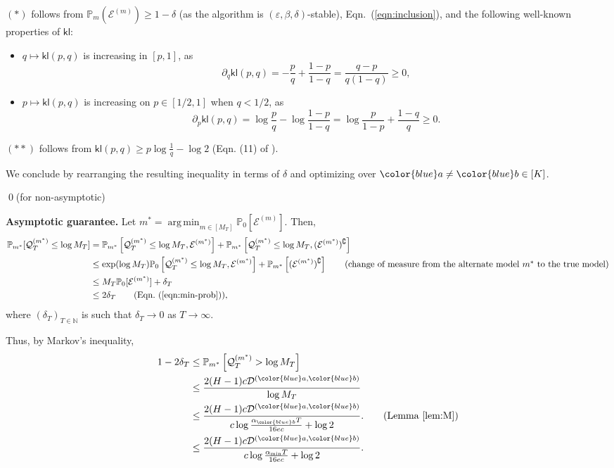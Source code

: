 \documentclass[twoside]{article}
\def\kl{{\mathsf{kl}}}
\def\eqref#1{(\ref{#1})}
\def\gD{{\mathcal{D}}}
\def\gE{{\mathcal{E}}}
\def\gQ{{\mathcal{Q}}}
\def\sN{{\mathbb{N}}}
\def\sP{{\mathbb{P}}}
\DeclareMathOperator*{\argmin}{arg\,min}
\theoremstyle{plain}
\begin{document}
$(*)$ follows from $\sP_m(\gE^{(m)}) \geq 1 - \delta$ (as the algorithm is $(\varepsilon, \beta, \delta)$-stable), Eqn.~\eqref{eqn:inclusion}, and the following well-known properties of $\kl$:
\begin{itemize}
    \item $q \mapsto \kl(p, q)$ is increasing in $[p, 1]$, as
    \begin{equation*}
        \partial_q \kl(p, q) = -\frac{p}{q} + \frac{1 - p}{1 - q}
        = \frac{q - p}{q(1 - q)} \geq 0,
    \end{equation*}
    \item $p \mapsto \kl(p, q)$ is increasing on $p \in [1/2, 1]$ when $q < 1/2$, as 
    \begin{equation*}
        \partial_p \kl(p, q) 
        = \log\frac{p}{q} - \log\frac{1 - p}{1 - q}
        = \log \frac{p}{1 - p} + \frac{1 - q}{q}
        \geq 0.
    \end{equation*}
\end{itemize}
$(**)$ follows from $\kl(p, q) \geq p \log\frac{1}{q} - \log 2$ (Eqn. (11) of \cite{garivier2019lower}).

We conclude by rearranging the resulting inequality in terms of $\delta$ and optimizing over ${\color{blue}a} \neq {\color{blue}b} \in [K]$.

\qed (for non-asymptotic)






\vspace{0.1cm}
\textbf{Asymptotic guarantee.}
Let $m^* = \argmin_{m \in [M_T]} \sP_0[\gE^{(m)}]$.
Then,
\begin{align*}
    \sP_{m^*}[\gQ_T^{(m^*)} \leq \log M_T] &= \sP_{m^*}\left[ \gQ_T^{(m^*)} \leq \log M_T, \gE^{(m^*)} \right] + \sP_{m^*}\left[\gQ_T^{(m^*)} \leq \log M_T, (\gE^{(m^*)})^\complement \right] \\
    &\leq \exp(\log M_T) \sP_0 \left[\gQ_T^{(m^*)} \leq \log M_T, \gE^{(m^*)} \right] + \sP_{m^*} \left[(\gE^{(m^*)})^\complement \right] \tag{change of measure from the alternate model $m^*$ to the true model} \\
    &\leq M_T \sP_0[\gE^{(m^*)}] + \delta_T \\
    &\leq 2\delta_T \tag{Eqn.~\eqref{eqn:min-prob}},
\end{align*}
where $(\delta_T)_{T \in \sN}$ is such that $\delta_T \rightarrow 0$ as $T \rightarrow \infty$.

Thus, by Markov's inequality,
\begin{align*}
    1 - 2\delta_T &\leq \sP_{m^*}\left[\gQ_T^{(m^*)} > \log M_T\right] \\
    &\leq \frac{2 (H - 1) c \gD^{({\color{blue} a}, {\color{blue} b})}}{\log M_T} \\
    &\leq \frac{2 (H - 1) c \gD^{({\color{blue} a}, {\color{blue} b})}}{c \log\frac{\alpha_{\color{blue}b} T}{16 ec} + \log 2}. \tag{Lemma~\ref{lem:M}} \\
    &\leq \frac{2 (H - 1) c \gD^{({\color{blue} a}, {\color{blue} b})}}{c \log\frac{\alpha_{\min} T}{16 ec} + \log 2}.
\end{align*}
\end{document}
